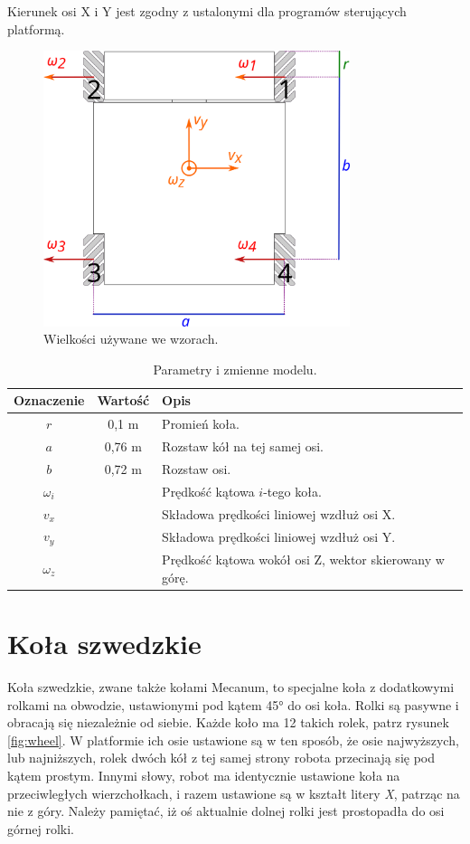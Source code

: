 	Kierunek osi X i Y jest zgodny z ustalonymi dla programów sterujących platformą.
	
	\begin{figure}[H]
		\centering
		\includegraphics[width=0.8\textwidth]{graphics/base_dims.pdf}
		\caption{Wielkości używane we wzorach.}
		\label{fig:base_dims}
	\end{figure} 

	\begin{table}
		\centering
		\begin{tabular}{c c l}
		Oznaczenie & Wartość & Opis \\
		\hline
		$r$ & 0,1 \si{\metre} & Promień koła. \\
		$a$ & 0,76 \si{\metre} & Rozstaw kół na tej samej osi. \\
		$b$ & 0,72 \si{\metre} & Rozstaw osi. \\
		$\omega_i$ & & Prędkość kątowa $i$-tego koła. \\
		$v_x$ & & Składowa prędkości liniowej wzdłuż osi X. \\
		$v_y$ & & Składowa prędkości liniowej wzdłuż osi Y. \\
		$\omega_z$ & & Prędkość kątowa wokół osi Z, wektor skierowany w górę. \\
		\end{tabular}
		\caption{Parametry i zmienne modelu.}
		\label{tab:dims}
	\end{table}
	
	

\section{Koła szwedzkie}
	Koła szwedzkie, zwane także kołami Mecanum, to specjalne koła z dodatkowymi rolkami na obwodzie, ustawionymi pod kątem \ang{45} do osi koła.
	Rolki są pasywne i obracają się niezależnie od siebie. Każde koło ma 12 takich rolek, patrz rysunek \ref{fig:wheel}.
	W platformie ich osie ustawione są w ten sposób, że osie najwyższych, lub najniższych, rolek dwóch kół z tej samej strony robota przecinają się pod kątem prostym.
	Innymi słowy, robot ma identycznie ustawione koła na przeciwległych wierzchołkach, i razem ustawione są w kształt litery \emph{X}, patrząc na nie z góry.
	Należy pamiętać, iż oś aktualnie dolnej rolki jest prostopadła do osi górnej rolki.


